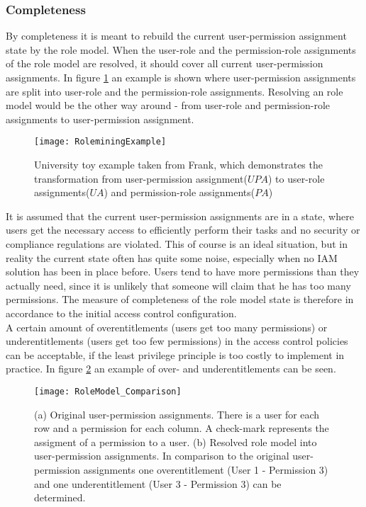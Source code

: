        \subsubsection{Completeness}
        By completeness it is meant to rebuild the current user-permission assignment state by the role model. When the user-role and the permission-role assignments of the role model are resolved, it should cover all current user-permission assignments. In figure \ref{fig:roleminingExample} an example is shown where user-permission assignments are split into user-role and the permission-role assignments. Resolving an role model would be the other way around - from user-role and permission-role assignments to user-permission assignment.
        \iffalse
        \hl{(FEEDBACK:different scenarios: 1. starting from scratch, 2. already have assignments)}
        \fi
        \begin{figure}[H]
            \centering
            \texttt{[image: RoleminingExample]}
            \caption{University toy example taken from Frank\cite{roleMiningExample}, which demonstrates the transformation from user-permission assignment($UPA$) to user-role assignments($UA$) and permission-role assignments($PA$)}
            \label{fig:roleminingExample}
        \end{figure}
        It is assumed that the current user-permission assignments are in a state, where users get the necessary access to efficiently perform their tasks and no security or compliance regulations are violated. This of course is an ideal situation, but in reality the current state often has quite some noise, especially when no IAM solution has been in place before. Users tend to have more permissions than they actually need, since it is unlikely that someone will claim that he has too many permissions. The measure of completeness of the role model state is therefore in accordance to the initial access control configuration.\\
        A certain amount of overentitlements (users get too many permissions) or underentitlements (users get too few permissions) in the access control policies can be acceptable, if the least privilege principle is too costly to implement in practice. In figure \ref{fig:rolemodelComparison} an example of over- and underentitlements can be seen.
        \begin{figure}[H]
            \centering
            \texttt{[image: RoleModel\_Comparison]}
            \caption{(a) Original user-permission assignments. There is a user for each row and a permission for each column. A check-mark represents the assigment of a permission to a user. (b) Resolved role model into user-permission assignments. In comparison to the original user-permission assignments one overentitlement (User 1 - Permission 3) and one underentitlement (User 3 - Permission 3) can be determined.}
            \label{fig:rolemodelComparison}
        \end{figure}
